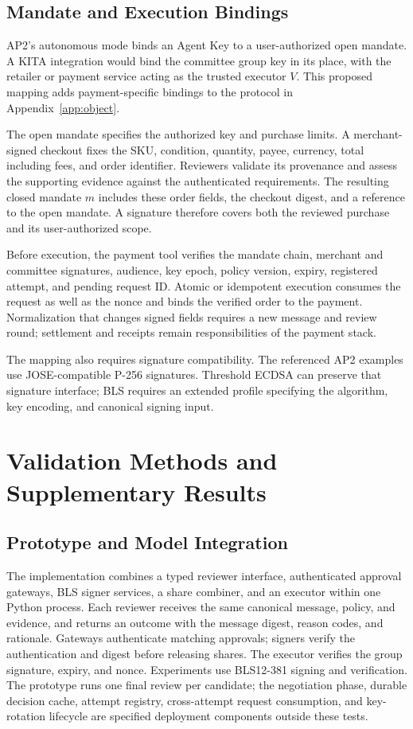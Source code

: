 \documentclass{article}
\begin{document}
\subsection{Mandate and Execution Bindings}

AP2's autonomous mode binds an Agent Key to a user-authorized open mandate.
A \textsf{KITA} integration would bind the committee group key in its place, with the
retailer or payment service acting as the trusted executor $V$. This proposed
mapping adds payment-specific bindings to the protocol in
Appendix~\ref{app:object}.

The open mandate specifies the authorized key and purchase limits. A
merchant-signed checkout fixes the SKU, condition, quantity, payee, currency,
total including fees, and order identifier. Reviewers validate its provenance
and assess the supporting evidence against the authenticated requirements.
The resulting closed mandate $m$ includes these order fields, the checkout
digest, and a reference to the open mandate. A signature therefore covers
both the reviewed purchase and its user-authorized scope.

Before execution, the payment tool verifies the mandate chain, merchant and
committee signatures, audience, key epoch, policy version, expiry, registered
attempt, and pending request ID. Atomic or idempotent execution consumes the
request as well as the nonce and binds the verified order to the payment. Normalization
that changes signed fields requires a new message and review round;
settlement and receipts remain responsibilities of the payment stack.

The mapping also requires signature compatibility. The referenced AP2
examples use JOSE-compatible P-256 signatures. Threshold ECDSA can preserve
that signature interface; BLS requires an extended profile specifying the
algorithm, key encoding, and canonical signing input.

\section{Validation Methods and Supplementary Results}
\label{app:evaluation}

\subsection{Prototype and Model Integration}

The implementation combines a typed reviewer interface, authenticated approval
gateways, BLS signer services, a share combiner, and an executor within one
Python process. Each reviewer receives the same canonical message, policy,
and evidence, and returns an outcome with the message digest, reason codes,
and rationale. Gateways authenticate matching approvals; signers verify the
authentication and digest before releasing shares. The executor verifies the
group signature, expiry, and nonce. Experiments use BLS12-381 signing and verification. The prototype runs one
final review per candidate; the negotiation phase, durable decision cache,
attempt registry, cross-attempt request consumption, and key-rotation lifecycle
are specified deployment components outside these tests.
\end{document}
